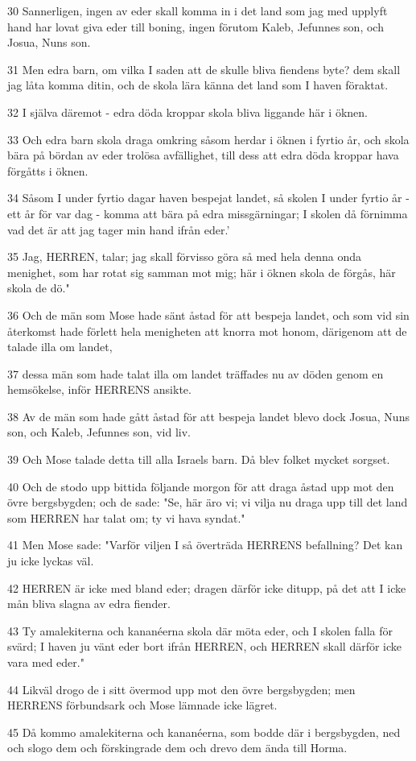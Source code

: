 \par 30 Sannerligen, ingen av eder skall komma in i det land som jag med upplyft hand har lovat giva eder till boning, ingen förutom Kaleb, Jefunnes son, och Josua, Nuns son.
\par 31 Men edra barn, om vilka I saden att de skulle bliva fiendens byte? dem skall jag låta komma ditin, och de skola lära känna det land som I haven föraktat.
\par 32 I själva däremot - edra döda kroppar skola bliva liggande här i öknen.
\par 33 Och edra barn skola draga omkring såsom herdar i öknen i fyrtio år, och skola bära på bördan av eder trolösa avfällighet, till dess att edra döda kroppar hava förgåtts i öknen.
\par 34 Såsom I under fyrtio dagar haven bespejat landet, så skolen I under fyrtio år - ett år för var dag - komma att bära på edra missgärningar; I skolen då förnimma vad det är att jag tager min hand ifrån eder.'
\par 35 Jag, HERREN, talar; jag skall förvisso göra så med hela denna onda menighet, som har rotat sig samman mot mig; här i öknen skola de förgås, här skola de dö."
\par 36 Och de män som Mose hade sänt åstad för att bespeja landet, och som vid sin återkomst hade förlett hela menigheten att knorra mot honom, därigenom att de talade illa om landet,
\par 37 dessa män som hade talat illa om landet träffades nu av döden genom en hemsökelse, inför HERRENS ansikte.
\par 38 Av de män som hade gått åstad för att bespeja landet blevo dock Josua, Nuns son, och Kaleb, Jefunnes son, vid liv.
\par 39 Och Mose talade detta till alla Israels barn. Då blev folket mycket sorgset.
\par 40 Och de stodo upp bittida följande morgon för att draga åstad upp mot den övre bergsbygden; och de sade: "Se, här äro vi; vi vilja nu draga upp till det land som HERREN har talat om; ty vi hava syndat."
\par 41 Men Mose sade: "Varför viljen I så överträda HERRENS befallning? Det kan ju icke lyckas väl.
\par 42 HERREN är icke med bland eder; dragen därför icke ditupp, på det att I icke mån bliva slagna av edra fiender.
\par 43 Ty amalekiterna och kananéerna skola där möta eder, och I skolen falla för svärd; I haven ju vänt eder bort ifrån HERREN, och HERREN skall därför icke vara med eder."
\par 44 Likväl drogo de i sitt övermod upp mot den övre bergsbygden; men HERRENS förbundsark och Mose lämnade icke lägret.
\par 45 Då kommo amalekiterna och kananéerna, som bodde där i bergsbygden, ned och slogo dem och förskingrade dem och drevo dem ända till Horma.

